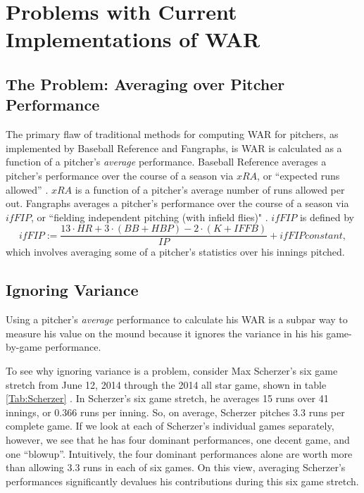 \documentclass[12pt]{article}
\begin{document}
\section{Problems with Current Implementations of WAR}\label{sec:theProblem}

\subsection{The Problem: Averaging over Pitcher Performance}

The primary flaw of traditional methods for computing WAR for pitchers, as implemented by Baseball Reference and Fangraphs, is WAR is calculated as a function of a pitcher's \textit{average} performance. Baseball Reference averages a pitcher's performance over the course of a season via $xRA$, or ``expected runs allowed''  \citep{war_BR}. $xRA$ is a function of a pitcher's average number of runs allowed per out. Fangraphs averages a pitcher's performance over the course of a season via $ifFIP$, or ``fielding independent pitching (with infield flies)" \citep{war_FG}. $ifFIP$ is defined by
$$ifFIP := \frac{13\cdot HR + 3\cdot(BB+HBP) - 2\cdot(K+IFFB)}{IP} + ifFIP constant,$$
which involves averaging some of a pitcher's statistics over his innings pitched. 

\subsection{Ignoring Variance}

Using a pitcher's \textit{average} performance to calculate his WAR is a subpar way to measure his value on the mound because it ignores the variance in his his game-by-game performance. 

To see why ignoring variance is a problem, consider Max Scherzer's six game stretch from June 12, 2014 through the 2014 all star game, shown in table \ref{Tab:Scherzer} \citep{Scherzer}. In Scherzer's six game stretch, he averages 15 runs over 41 innings, or $0.366$ runs per inning. So, on average, Scherzer pitches $3.3$ runs per complete game. If we look at each of Scherzer's individual games separately, however, we see that he has four dominant performances, one decent game, and one ``blowup''. Intuitively, the four dominant performances alone are worth more than allowing 3.3 runs in each of six games. On this view, averaging Scherzer's performances significantly devalues his contributions during this six game stretch. 
\end{document}
